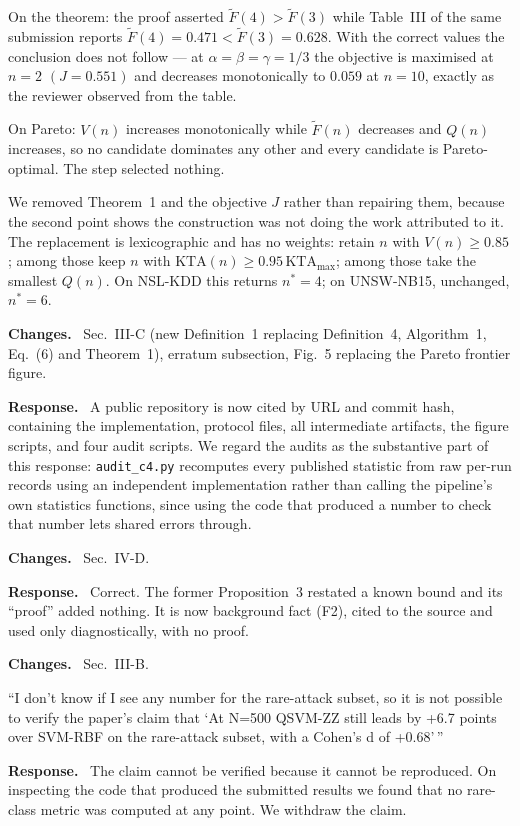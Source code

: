 \documentclass[11pt,a4paper]{article}
\newenvironment{revcomment}
  {\par\addvspace{6pt}\begingroup
   \color{quotegray}\itshape\small
   \begin{list}{}{%
     \setlength{\leftmargin}{1.8em}\setlength{\rightmargin}{1.0em}%
     \setlength{\topsep}{0pt}\setlength{\partopsep}{0pt}%
     \setlength{\parsep}{3pt}\setlength{\itemsep}{0pt}}%
   \item[]}
  {\end{list}\endgroup\normalcolor\addvspace{6pt}}
\newcommand{\itemhead}[2]{%
  \par\addvspace{15pt}%
  \noindent{\bfseries\color{tagink}#1}\hspace{0.7em}{\bfseries #2}%
  \par\addvspace{3.5pt}%
  \noindent{\color{rulegray}\rule{\linewidth}{0.5pt}}%
  \par\addvspace{5pt}%
  \nobreak}
\newcommand{\resp}{\par\addvspace{2pt}\noindent\textbf{Response.}\ }
\newcommand{\changed}{\par\addvspace{5pt}\noindent
  {\bfseries\color{tagink}Changes.}\ }
\begin{document}
On the theorem: the proof asserted $\tilde F(4)>\tilde F(3)$ while Table~III of
the same submission reports $\tilde F(4)=0.471 < \tilde F(3)=0.628$. With the
correct values the conclusion does not follow --- at
$\alpha=\beta=\gamma=1/3$ the objective is maximised at $n=2$ $(J=0.551)$ and
decreases monotonically to $0.059$ at $n=10$, exactly as the reviewer observed
from the table.

On Pareto: $V(n)$ increases monotonically while $\tilde F(n)$ decreases and
$Q(n)$ increases, so no candidate dominates any other and every candidate is
Pareto-optimal. The step selected nothing.

We removed Theorem~1 and the objective $J$ rather than repairing them, because
the second point shows the construction was not doing the work attributed to it.
The replacement is lexicographic and has no weights: retain $n$ with
$V(n)\ge0.85$; among those keep $n$ with $\mathrm{KTA}(n)\ge0.95\,\mathrm{KTA}_{\max}$;
among those take the smallest $Q(n)$. On NSL-KDD this returns $n^{\ast}=4$; on
UNSW-NB15, unchanged, $n^{\ast}=6$.
\changed
Sec.~III-C (new Definition~1 replacing Definition~4, Algorithm~1, Eq.~(6) and
Theorem~1), erratum subsection, Fig.~5 replacing the Pareto frontier figure.

\itemhead{R4-3}{Reproducibility is asserted but no machinery is provided}
\resp
A public repository is now cited by URL and commit hash, containing the
implementation, protocol files, all intermediate artifacts, the figure scripts,
and four audit scripts. We regard the audits as the substantive part of this
response: \texttt{audit\_c4.py} recomputes every published statistic from raw
per-run records using an independent implementation rather than calling the
pipeline's own statistics functions, since using the code that produced a number
to check that number lets shared errors through.
\changed
Sec.~IV-D.

\itemhead{R4-4}{Proposition~3 is cited to another paper but not derived}
\resp
Correct. The former Proposition~3 restated a known bound and its ``proof'' added
nothing. It is now background fact (F2), cited to the source and used only
diagnostically, with no proof.
\changed
Sec.~III-B.

\itemhead{R4-5}{No numbers are given for the rare-attack subset, so the
$+6.7$-point claim cannot be verified}
\begin{revcomment}
``I don't know if I see any number for the rare-attack subset, so it is not
possible to verify the paper's claim that `At N=500 QSVM-ZZ still leads by +6.7
points over SVM-RBF on the rare-attack subset, with a Cohen's d of +0.68'\,''
\end{revcomment}
\resp
The claim cannot be verified because it cannot be reproduced. On inspecting the
code that produced the submitted results we found that no rare-class metric was
computed at any point. We withdraw the claim.
\end{document}
